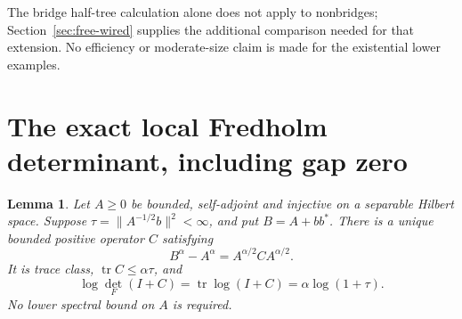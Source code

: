 \documentclass[11pt]{article}
\newtheorem{lemma}[theorem]{Lemma}
\newcommand{\tr}{\operatorname{tr}}
\begin{document}
The bridge half-tree calculation alone does not apply to nonbridges;
Section~\ref{sec:free-wired} supplies the additional comparison needed
for that extension. No efficiency or moderate-size claim is made for
the existential lower examples.

\section{The exact local Fredholm determinant, including gap zero}
\begin{lemma}\label{lem:fredholm}
Let $A\ge0$ be bounded, self-adjoint and injective on a separable Hilbert
space. Suppose $\tau=\|A^{-1/2}b\|^2<\infty$, and put $B=A+bb^*$.
There is a unique bounded positive operator $C$ satisfying
\[
 B^\alpha-A^\alpha=A^{\alpha/2}CA^{\alpha/2}.
\]
It is trace class, $\tr C\le\alpha\tau$, and
\begin{equation}\label{eq:fredholm}
 \log\det_F(I+C)=\tr\log(I+C)=\alpha\log(1+\tau).
\end{equation}
No lower spectral bound on $A$ is required.
\end{lemma}
\end{document}
